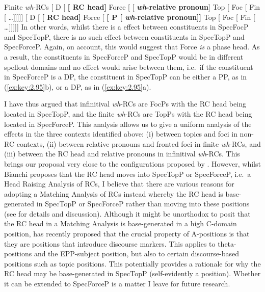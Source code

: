\documentclass[output=paper]{langsci/langscibook}
\begin{document}
\ea\label{ex:key:2.95} Finite \emph{wh}-\glspl{RC}
    \ea {}[ D [ \textbf{[ RC head]} Force [ [\textbf{ \emph{wh}-relative pronoun}] Top [ Foc [ Fin [ \dots{}]]]]]
    \ex {}[ D [ \textbf{[ RC head]} Force
    [ \textbf{[ P [ \emph{wh}-relative pronoun]]} Top [ Foc [ Fin [  \dots{}]]]]]
    \z
\z
In other words, whilst there is a  effect between
constituents in SpecFocP and SpecTopP, there is no such effect between
constituents in SpecTopP and SpecForceP\@. Again, on 
account, this would suggest that Force \emph{is} a phase head. As a
result, the constituents in SpecForceP and SpecTopP would be in different
spellout domains and no  effect would arise
between them, i.e.\ if the constituent in SpecForceP is a DP, the constituent
in SpecTopP can be either a PP, as in (\ref{ex:key:2.95}b), or a DP, as in
(\ref{ex:key:2.95}a).

I have thus argued that infinitival \emph{wh}{-\glspl{RC} are FocPs with the \gls{RC} head
being located in SpecTopP, and the finite} \emph{wh}{-\glspl{RC} are TopPs with the RC
head being located in SpecForceP\@.} This analysis allows us to give a uniform
analysis of the  effects in the three contexts
identified above: (i) between topics and foci in non-RC contexts, (ii) between
relative pronouns and fronted foci in finite \emph{wh}-\glspl{RC}, and (iii)
between the \gls{RC} head and relative pronouns in
infinitival \emph{wh}{-RCs.} This brings our
proposal very close to the configurations proposed by
\textcite{Bianchi1999,Bianchi2000,Bianchi2004}. However, whilst Bianchi
proposes that the \gls{RC} head moves into SpecTopP or
SpecForceP, i.e.\ a Head Raising Analysis
of RCs, I believe that there are various reasons for adopting a Matching
Analysis of \glspl{RC} instead whereby the RC head is
base-generated in SpecTopP or SpecForceP rather than moving into these
positions (see \citealt[Ch.\ 2]{Douglas2016} for details and discussion).
Although it might be unorthodox to posit that the \gls{RC}
head in a Matching Analysis is base-generated in a high C-domain position,
\textcite{Chierchia2016} has recently proposed that the crucial property of
A-positions is that they are positions that introduce discourse markers.  This
applies to theta-positions and the \gls{EPP}-subject
position, but also to certain discourse-based
positions such as topic positions. This potentially provides a rationale for
why the \gls{RC} head may be base-generated in SpecTopP (self-evidently a
 position).  Whether it can be extended to SpecForceP is a matter I
leave for future research.
\end{document}
